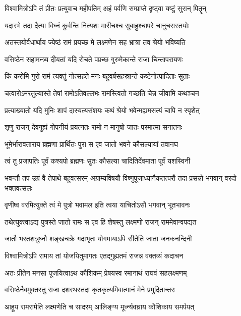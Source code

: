 \twolineshloka
{विश्वामित्रोऽपि तं प्रीतः प्रत्युवाच महीपतिम्}
{अहं पर्वणि सम्प्राप्ते दृष्ट्वा यष्टुं सुरान् पितॄन्} %

\twolineshloka
{यदारभे तदा दैत्या विघ्नं कुर्वन्ति नित्यशः}
{मारीचश्च सुबाहुश्चापरे चानुचरास्तयोः} %

\twolineshloka
{अतस्तयोर्वधार्थाय ज्येष्ठं रामं प्रयच्छ मे}
{लक्ष्मणेन सह भ्रात्रा तव श्रेयो भविष्यति} %

\twolineshloka
{वसिष्ठेन सहामन्त्र्य दीयतां यदि रोचते}
{पप्रच्छ गुरुमेकान्ते राजा चिन्तापरायणः} %

\twolineshloka
{किं करोमि गुरो रामं त्यक्तुं नोत्सहते मनः}
{बहुवर्षसहस्रान्ते कष्टेनोत्पादिताः सुताः} %

\twolineshloka
{चत्वारोऽमरतुल्यास्ते तेषां रामोऽतिवल्लभः}
{रामस्त्वितो गच्छति चेन्न जीवामि कथञ्चन} %

\twolineshloka
{प्रत्याख्यातो यदि मुनिः शापं दास्यत्यसंशयः}
{कथं श्रेयो भवेन्मह्यमसत्यं चापि न स्पृशेत्} %


\twolineshloka
{शृणु राजन् देवगुह्यं गोपनीयं प्रयत्नतः}
{रामो न मानुषो जातः परमात्मा सनातनः} %

\twolineshloka
{भूमेर्भारावताराय ब्रह्मणा प्रार्थितः पुरा}
{स एव जातो भवने कौसल्यायां तवानघ} %

\twolineshloka
{त्वं तु प्रजापतिः पूर्वं कश्यपो ब्रह्मणः सुतः}
{कौसल्या चादितिर्देवमाता पूर्वं यशस्विनी} %

\threelineshloka
{भवन्तौ तप उग्रं वै तेपाथे बहुवत्सरम्}
{अग्राम्यविषयौ विष्णुपूजाध्यानैकतत्परौ}
{तदा प्रसन्नो भगवान् वरदो भक्तवत्सलः} %

\twolineshloka
{वृणीष्व वरमित्युक्ते त्वं मे पुत्रो भवामल}
{इति त्वया याचितोऽसौ भगवान् भूतभावनः} %

\twolineshloka
{तथेत्युक्त्वाऽद्य पुत्रस्ते जातो रामः स एव हि}
{शेषस्तु लक्ष्मणो राजन् राममेवान्वपद्यत} %

\twolineshloka
{जातौ भरतशत्रुघ्नौ शङ्खचक्रे गदाभृतः}
{योगमायाऽपि सीतेति जाता जनकनन्दिनी} %

\twolineshloka
{विश्वामित्रोऽपि रामाय तां योजयितुमागतः}
{एतद्गुह्यतमं राजन्न वक्तव्यं कदाचन} %

\twolineshloka
{अतः प्रीतेन मनसा पूजयित्वाऽथ कौशिकम्}
{प्रेषयस्व रमानाथं राघवं सहलक्ष्मणम्} %

\twolineshloka
{वसिष्ठेनैवमुक्तस्तु राजा दशरथस्तदा}
{कृतकृत्यमिवात्मानं मेने प्रमुदितान्तरः} %

\twolineshloka
{आहूय रामरामेति लक्ष्मणेति च सादरम्}
{आलिङ्ग्य मूर्ध्न्यवघ्राय कौशिकाय समर्पयत्} %

